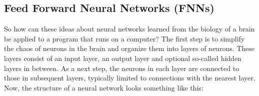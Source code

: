 \subsection{Feed Forward Neural Networks (FNNs)}\label{subsec:feed-forward-neural-networks-(fnns)}
So how can these ideas about neural networks learned from the biology of a brain be applied to a program that runs on a computer?
The first step is to simplify the chaos of neurons in the brain and organize them into layers of neurons.
These layers consist of an input layer, an output layer and optional so-called hidden layers in between.
As a next step, the neurons in each layer are connected to those in subsequent layers, typically limited to connections with the nearest layer.\cite{Hardesty2017}
\\
Now, the structure of a neural network looks something like this:
